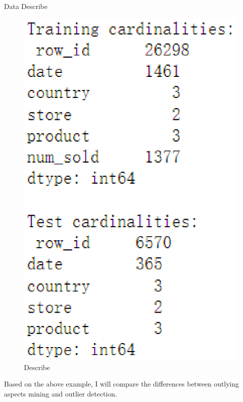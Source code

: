 \documentclass[
 size=14pt,
 paper=smartboard,  %
 mode=present, 		%
 display=slides, 	%
 style=tuliplab,  	%
 pauseslide,
 fleqn,leqno]{powerdot}
\begin{document}
\begin{slide}[toc=,bm=]{ Data Describe}
\begin{center}
\begin{figure}     
\centering     
\includegraphics[totalheight=2.8in]{01.eps}     
\caption{Describe}     
\end{figure}
\end{center}

\bigskip



\begin{note}
Based on the above example, 
I will compare the differences 
between outlying aspects mining and outlier detection.


\end{note}
\end{slide}
\end{document}
